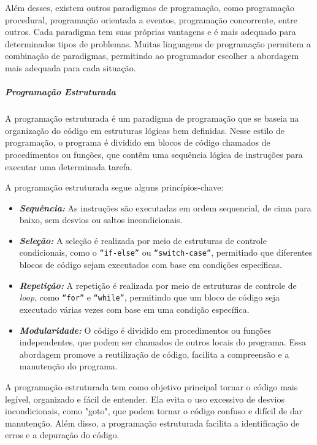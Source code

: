 \documentclass[a4paper, 12pt, onecolumn,singlespacing]{article}
\begin{document}
	Além desses, existem outros paradigmas de programação, como programação procedural, programação orientada a eventos, programação concorrente, entre outros. Cada paradigma tem suas próprias vantagens e é mais adequado para determinados tipos de problemas. Muitas linguagens de programação permitem a combinação de paradigmas, permitindo ao programador escolher a abordagem mais adequada para cada situação.
	
	\subparagraph{Programação Estruturada} A programação estruturada é um paradigma de programação que se baseia na organização do código em estruturas lógicas bem definidas. Nesse estilo de programação, o programa é dividido em blocos de código chamados de procedimentos ou funções, que contêm uma sequência lógica de instruções para executar uma determinada tarefa.
	
	A programação estruturada segue alguns princípios-chave:
	\begin{itemize}
		\item  \textbf{\textit{Sequência:}} As instruções são executadas em ordem sequencial, de cima para baixo, sem desvios ou saltos incondicionais.
		
		\item \textbf{\textit{Seleção:}} A seleção é realizada por meio de estruturas de controle condicionais, como o \texttt{``if-else''} ou \texttt{``switch-case''}, permitindo que diferentes blocos de código sejam executados com base em condições específicas.
		
		\item \textbf{\textit{Repetição:}} A repetição é realizada por meio de estruturas de controle de \textit{loop}, como \texttt{``for''} e \texttt{``while''}, permitindo que um bloco de código seja executado várias vezes com base em uma condição específica.
		
		\item \textbf{\textit{Modularidade:}} O código é dividido em procedimentos ou funções independentes, que podem ser chamados de outros locais do programa. Essa abordagem promove a reutilização de código, facilita a compreensão e a manutenção do programa.
		
	\end{itemize}
	
	A programação estruturada tem como objetivo principal tornar o código mais legível, organizado e fácil de entender. Ela evita o uso excessivo de desvios incondicionais, como "goto", que podem tornar o código confuso e difícil de dar manutenção. Além disso, a programação estruturada facilita a identificação de erros e a depuração do código.
	
\end{document}

